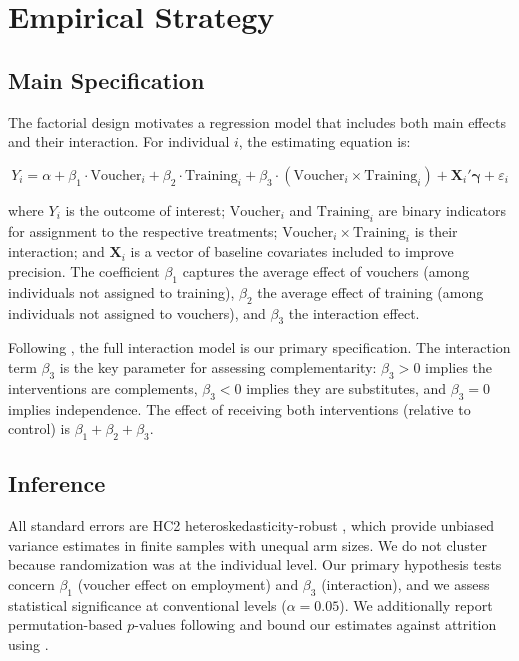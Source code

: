 \documentclass[12pt]{article}
\begin{document}
\section{Empirical Strategy}\label{sec:empirical}

\subsection{Main Specification}

The factorial design motivates a regression model that includes both main effects and their interaction. For individual $i$, the estimating equation is:

\begin{equation}\label{eq:main}
Y_i = \alpha + \beta_1 \cdot \text{Voucher}_i + \beta_2 \cdot \text{Training}_i + \beta_3 \cdot (\text{Voucher}_i \times \text{Training}_i) + \mathbf{X}_i'\boldsymbol{\gamma} + \varepsilon_i
\end{equation}

\noindent where $Y_i$ is the outcome of interest; $\text{Voucher}_i$ and $\text{Training}_i$ are binary indicators for assignment to the respective treatments; $\text{Voucher}_i \times \text{Training}_i$ is their interaction; and $\mathbf{X}_i$ is a vector of baseline covariates included to improve precision. The coefficient $\beta_1$ captures the average effect of vouchers (among individuals not assigned to training), $\beta_2$ the average effect of training (among individuals not assigned to vouchers), and $\beta_3$ the interaction effect.

Following \citet{muralidharan2023factorial}, the full interaction model is our primary specification. The interaction term $\beta_3$ is the key parameter for assessing complementarity: $\beta_3 > 0$ implies the interventions are complements, $\beta_3 < 0$ implies they are substitutes, and $\beta_3 = 0$ implies independence. The effect of receiving both interventions (relative to control) is $\beta_1 + \beta_2 + \beta_3$.

\subsection{Inference}

All standard errors are HC2 heteroskedasticity-robust \citep{mackinnon1985some}, which provide unbiased variance estimates in finite samples with unequal arm sizes. We do not cluster because randomization was at the individual level. Our primary hypothesis tests concern $\beta_1$ (voucher effect on employment) and $\beta_3$ (interaction), and we assess statistical significance at conventional levels ($\alpha = 0.05$). We additionally report permutation-based $p$-values following \citet{young2019channeling} and bound our estimates against attrition using \citet{lee2009training}.
\end{document}
